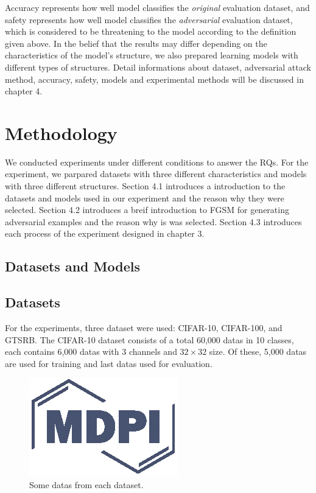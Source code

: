 \documentclass[journal,article,submit,moreauthors,pdftex]{Definitions/mdpi}
\begin{document}
Accuracy represents how well model classifies the {\it original} evaluation dataset, and safety represents how well model classifies the {\it adversarial} evaluation dataset, which is considered to be threatening to the model according to the definition given above.
In the belief that the results may differ depending on the characteristics of the model's structure, we also prepared learning models with different types of structures. 
Detail informations about dataset, adversarial attack method, accuracy, safety, models and experimental methods will be discussed in chapter 4.

\section{Methodology}

We conducted experiments under different conditions to answer the RQs. For the experiment, we parpared datasets with three different characteristics and models with three different structures.
Section 4.1 introduces a introduction to the datasets and models used in our experiment and the reason why they were selected.
Section 4.2 introduces a breif introduction to FGSM for generating adversarial examples and the reason why is was selected.
Section 4.3 introduces each process of the experiment designed in chapter 3.

\subsection{Datasets and Models}

\subsection{Datasets}

For the experiments, three dataset were used: CIFAR-10, CIFAR-100, and GTSRB. The CIFAR-10 dataset consists of a total 60,000 datas in 10 classes, each contains 6,000 datas with 3 channels and \begin{math}{32\times 32}\end{math} size.
Of these, 5,000 datas are used for training and last datas used for evaluation.

\begin{figure}[H] 
\includegraphics[width=5 cm]{Definitions/logo-mdpi}
\caption{Some datas from each dataset.\label{fig3}}
\end{figure} 
\end{document}
